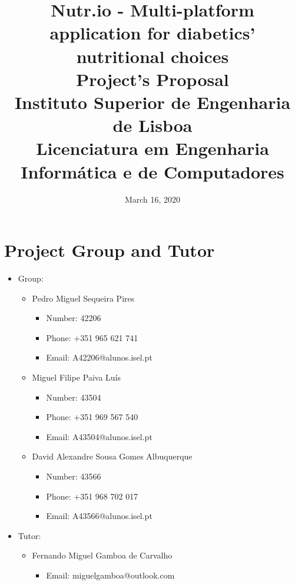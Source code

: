 \documentclass{article}
\title{
\vspace{-10mm}
\hline
\vspace{5mm}
\Huge Nutr.io - Multi-platform application for diabetics' nutritional choices\\
\Large Project's Proposal\\
\Large Instituto Superior de Engenharia de Lisboa\\
\Large Licenciatura em Engenharia Informática e de Computadores
\vspace{5mm}
\hline
\vspace{-10mm}
}
\date{March 16, 2020}
\begin{document}
\maketitle

\section{Project Group and Tutor}
    \begin{itemize}
        \item Group:
            \begin{itemize}
            \item Pedro Miguel Sequeira Pires
            \begin{itemize}
                \item Number: 42206
                \item Phone: +351 965 621 741
                \item Email: A42206@alunos.isel.pt
            \end{itemize}
        \end{itemize}
        \begin{itemize}
            \item Miguel Filipe Paiva Luís
            \begin{itemize}
                \item Number: 43504
                \item Phone: +351 969 567 540
                \item Email: A43504@alunos.isel.pt
            \end{itemize}
        \end{itemize}
        \begin{itemize}
            \item David Alexandre Sousa Gomes Albuquerque
            \begin{itemize}
                \item Number: 43566
                \item Phone: +351 968 702 017
                \item Email: A43566@alunos.isel.pt
            \end{itemize}
        \end{itemize}
    \end{itemize}
    \begin{itemize}
            \item Tutor:
            \begin{itemize}
                \item Fernando Miguel Gamboa de Carvalho
                \begin{itemize}
                    \item Email: miguelgamboa@outlook.com
                \end{itemize}
            \end{itemize}
        \end{itemize}
    
\end{document}
